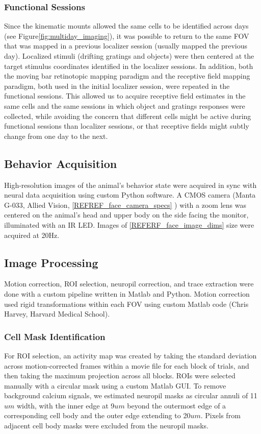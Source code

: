 \subsubsection{Functional Sessions}
Since the kinematic mounts allowed the same cells to be identified across days (see Figure\ref{fig:multiday_imaging}), it was possible to return to the same FOV that was mapped in a previous localizer session (usually mapped the previous day). Localized stimuli (drifting gratings and objects) were then centered at the target stimulus coordinates identified in the localizer sessions. In addition, both the moving bar retinotopic mapping paradigm and the receptive field mapping paradigm, both used in the initial localizer session, were repeated in the functional sessions. This allowed us to acquire receptive field estimates in the same cells and the same sessions in which object and gratings responses were collected, while avoiding the concern that different cells might be active during functional sessions than localizer sessions, or that receptive fields might subtly change from one day to the next.

\subsection{Behavior Acquisition}
High-resolution images of the animal's behavior state were acquired in sync with neural data acquisition using custom Python software. A CMOS camera (Manta G-033, Allied Vision, \ref{REFREF_face_camera_specs} ) with a zoom lens was centered on the animal's head and upper body on the side facing the monitor, illuminated with an IR LED. Images of \ref{REFERF_face_image_dims} size were acquired at 20Hz. 

\subsection{Image Processing}
Motion correction, ROI selection, neuropil correction, and trace extraction were done with a custom pipeline written in Matlab and Python. Motion correction used rigid transformations within each FOV using custom Matlab code (Chris Harvey, Harvard Medical School). 
\subsubsection{Cell Mask Identification}
For ROI selection, an activity map was created by taking the standard deviation across motion-corrected frames within a movie file for each block of trials, and then taking the maximum projection across all blocks. ROIs were selected manually with a circular mask using a custom Matlab GUI. To remove background calcium signals, we estimated neuropil masks as circular annuli of 11$um$ width, with the inner edge at 9$um$ beyond the outermost edge of a corresponding cell body and the outer edge extending to 20$um$. Pixels from adjacent cell body masks were excluded from the neuropil masks. 
